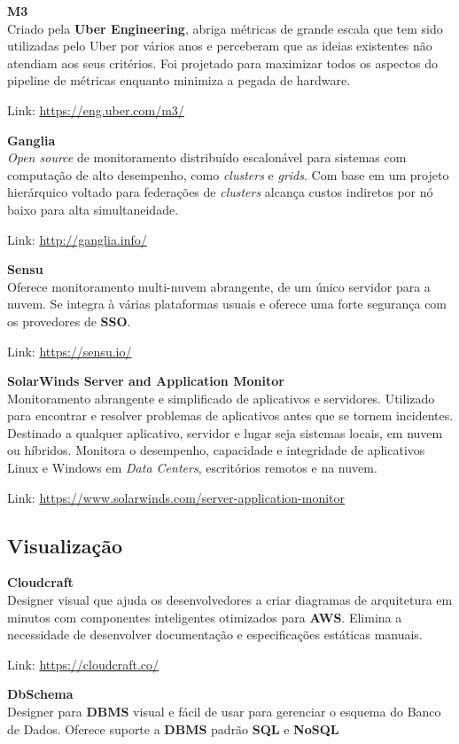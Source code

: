 \documentclass[fleqn,10pt]{SelfArx} %
\begin{document}
\textbf{M3} \\
Criado pela \textbf{Uber Engineering}, abriga métricas de grande escala que tem sido utilizadas pelo Uber por vários anos e perceberam que as ideias existentes não atendiam aos seus critérios. Foi projetado para maximizar todos os aspectos do pipeline de métricas enquanto minimiza a pegada de hardware.

Link: \url{https://eng.uber.com/m3/}

\textbf{Ganglia} \\
\textit{Open source} de monitoramento distribuído escalonável para sistemas com computação de alto desempenho, como \textit{clusters} e \textit{grids}. Com base em um projeto hierárquico voltado para federações de \textit{clusters} alcança custos indiretos por nó baixo para alta simultaneidade.

Link: \url{http://ganglia.info/}

\textbf{Sensu} \\
Oferece monitoramento multi-nuvem abrangente, de um único servidor para a nuvem. Se integra à várias plataformas usuais e oferece uma forte segurança com os provedores de \textbf{SSO}.

Link: \url{https://sensu.io/}

\textbf{SolarWinds Server and Application Monitor} \\
Monitoramento abrangente e simplificado de aplicativos e servidores. Utilizado para encontrar e resolver problemas de aplicativos antes que se tornem incidentes. Destinado a qualquer aplicativo, servidor e lugar seja sistemas locais, em nuvem ou híbridos. Monitora o desempenho, capacidade e integridade de aplicativos Linux e Windows em \textit{Data Centers}, escritórios remotos e na nuvem.

Link: \url{https://www.solarwinds.com/server-application-monitor}

\subsection*{Visualização}

\textbf{Cloudcraft} \\
Designer visual que ajuda os desenvolvedores a criar diagramas de arquitetura em minutos com componentes inteligentes otimizados para \textbf{AWS}. Elimina a necessidade de desenvolver documentação e especificações estáticas manuais.

Link: \url{https://cloudcraft.co/}

\textbf{DbSchema} \\
Designer para \textbf{DBMS} visual e fácil de usar para gerenciar o esquema do Banco de Dados. Oferece suporte a \textbf{DBMS} padrão \textbf{SQL} e \textbf{NoSQL}
\end{document}
